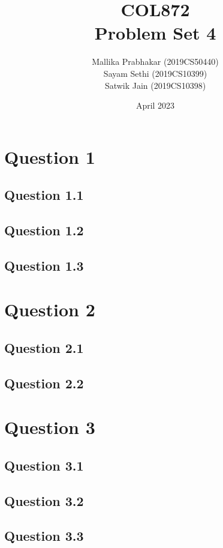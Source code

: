 \documentclass[11pt]{article}
\title{COL872\\Problem Set 4}
\author{Mallika Prabhakar (2019CS50440)\\Sayam Sethi (2019CS10399)\\Satwik Jain (2019CS10398)}
\date{April 2023}
\begin{document}
\maketitle

\tableofcontents


\newpage
\section{Question 1}
\subsection{Question 1.1}

\subsection{Question 1.2}

\subsection{Question 1.3}


\newpage
\section{Question 2}


\subsection{Question 2.1}

\subsection{Question 2.2}


\newpage
\section{Question 3}
\subsection{Question 3.1}

\subsection{Question 3.2}

\subsection{Question 3.3}

\end{document}
